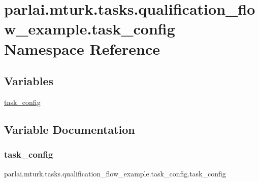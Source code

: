 \hypertarget{namespaceparlai_1_1mturk_1_1tasks_1_1qualification__flow__example_1_1task__config}{}\section{parlai.\+mturk.\+tasks.\+qualification\+\_\+flow\+\_\+example.\+task\+\_\+config Namespace Reference}
\label{namespaceparlai_1_1mturk_1_1tasks_1_1qualification__flow__example_1_1task__config}
\subsection*{Variables}
\begin{DoxyCompactItemize}
\item 
\hyperlink{namespaceparlai_1_1mturk_1_1tasks_1_1qualification__flow__example_1_1task__config_a87df04d35c96022f0e5a6a1371daad02}{task\+\_\+config}
\end{DoxyCompactItemize}


\subsection{Variable Documentation}
\mbox{\label{namespaceparlai_1_1mturk_1_1tasks_1_1qualification__flow__example_1_1task__config_a87df04d35c96022f0e5a6a1371daad02}} 
\subsubsection{\texorpdfstring{task\+\_\+config}{task\_config}}
{\footnotesize\ttfamily parlai.\+mturk.\+tasks.\+qualification\+\_\+flow\+\_\+example.\+task\+\_\+config.\+task\+\_\+config}

